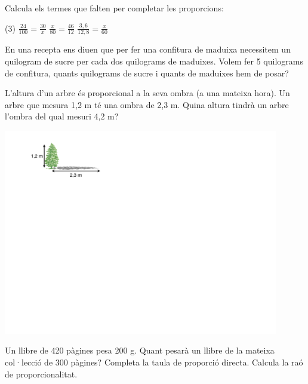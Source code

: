 \begin{mylist}
\exer
  Calcula els termes que falten per completar les proporcions:
	\begin{tasks}(3)
		\task $\frac{24}{100}=\frac{30}{x}$
		\task $\frac{x}{80}=\frac{46}{12}$
		\task $\frac{3,6}{12,8}= \frac{x}{60}$	
	\end{tasks}

\answers{[125, $\frac{920}{3}=306.666$, 16.875]}

\exer
  En una recepta ens diuen que per fer una confitura de maduixa
  necessitem un quilogram de sucre per cada dos quilograms de maduixes.
  Volem fer 5 quilograms de confitura, quants quilograms de sucre i
  quants de maduixes hem de posar?

  
\vspace{-1.25cm}
\exer \begin{minipage}[t]{0.7\textwidth}
	  L'altura d'un arbre és proporcional a la seva ombra (a una mateixa
	hora). Un arbre que mesura 1,2 m té una ombra de 2,3 m. Quina altura
	tindrà un arbre l'ombra del qual mesuri 4,2 m?
\end{minipage}
\begin{minipage}{0.3\textwidth}
	\centering
	\vspace{1.5cm}
	\includegraphics[width=0.9\textwidth]{img-07/arbre}
\end{minipage}

 

\exer
  Un llibre de 420 pàgines pesa 200 g. Quant pesarà un llibre de la
  mateixa col·lecció de 300 pàgines?
\exer \spen
  Completa la taula de proporció directa.
  Calcula la raó de proporcionalitat.
 

\end{mylist}
